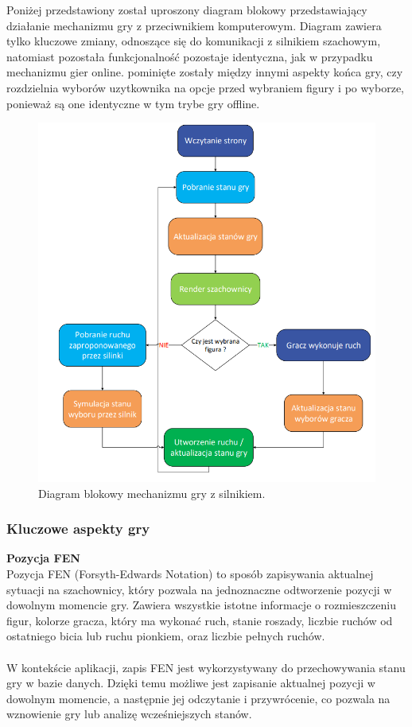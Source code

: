 \documentclass[12pt,a4paper]{article}
\begin{document}
\newpage

\noindent
Poniżej przedstawiony został uproszony diagram blokowy przedstawiający działanie mechanizmu gry z przeciwnikiem komputerowym. Diagram zawiera tylko kluczowe zmiany, odnoszące się do komunikacji z silnikiem szachowym, natomiast pozostała funkcjonalność pozostaje identyczna, jak w przypadku mechanizmu gier online. pominięte zostały między innymi aspekty końca gry, czy rozdzielnia wyborów uzytkownika na opcje przed wybraniem figury i po wyborze, ponieważ są one identyczne w tym trybe gry offline.

\vspace{1cm}
\begin{figure}[h!]
    \centering
    \includegraphics[width=1\textwidth]{images/diagram_enggry.png}
    \caption{Diagram blokowy mechanizmu gry z silnikiem.}
\end{figure}

\newpage

\subsubsection{Kluczowe aspekty gry}

\noindent \textbf{Pozycja FEN}\\
Pozycja FEN (Forsyth-Edwards Notation) to sposób zapisywania aktualnej sytuacji na szachownicy, który pozwala na jednoznaczne odtworzenie pozycji w dowolnym momencie gry. Zawiera wszystkie istotne informacje o rozmieszczeniu figur, kolorze gracza, który ma wykonać ruch, stanie roszady, liczbie ruchów od ostatniego bicia lub ruchu pionkiem, oraz liczbie pełnych ruchów.
\\\\
W kontekście aplikacji, zapis FEN jest wykorzystywany do przechowywania stanu gry w bazie danych. Dzięki temu możliwe jest zapisanie aktualnej pozycji w dowolnym momencie, a następnie jej odczytanie i przywrócenie, co pozwala na wznowienie gry lub analizę wcześniejszych stanów.
\end{document}
